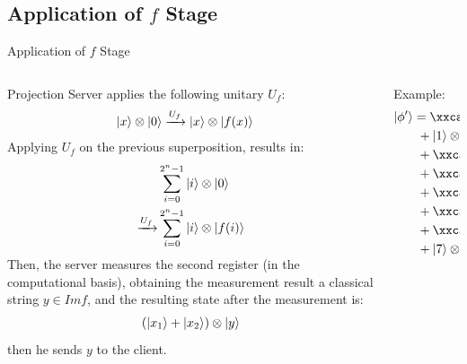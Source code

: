 \documentclass[]{beamer}
\begin{document}
\subsection{Application of $f$ Stage}
\begin{frame}[label=current]{Application of $f$ Stage}
  \begin{columns}
    \begin{column}{.4\textwidth}
      \begin{block}{Projection}
        Server applies the following unitary $U_f$:
        \begin{align*}
        & |x\rangle\otimes|0\rangle \xrightarrow{U_f} |x\rangle\otimes|f(x)\rangle
        \end{align*}
        Applying $U_f$ on the previous superposition, results in:
        \begin{align*}
          & \sum_{i=0}^{2^n-1} |i\rangle\otimes|0\rangle\\
          \xrightarrow{U_f} & \sum_{i=0}^{2^n-1} |i\rangle\otimes|f(i)\rangle
        \end{align*}
        Then, the server measures the second register (in the computational basis), obtaining the measurement result a classical string $y \in Imf$, and the resulting state after the measurement is: 
        \begin{align*}
          (|x_1\rangle + |x_2\rangle)\otimes|y\rangle
        \end{align*}
        then he sends $y$ to the client.
      \end{block}
    \end{column}
    \vrule{}
    \quad
   
    \begin{column}{.5\textwidth}
    
      Example:
      \begin{align*}
        \ket{\phi'}
        &= \xxcancel<2>{\ket{0}\otimes\textcolor{red}{\ket{4}}}\\
        &~+ \ket{1}\otimes\textcolor{blue}{\ket{2}}\\
        &~+ \xxcancel<2>{\ket{2}\otimes\textcolor{green}{\ket{6}}}\\
        &~+ \xxcancel<2>{\ket{3}\otimes\textcolor{red}{\ket{4}}}\\
        &~+ \xxcancel<2>{\ket{4}\otimes\textcolor{orange}{\ket{8}}}\\
        &~+ \xxcancel<2>{\ket{5}\otimes\textcolor{green}{\ket{6}}}\\
        &~+ \xxcancel<2>{\ket{6}\otimes\textcolor{orange}{\ket{8}}}\\
        &~+ \ket{7}\otimes\textcolor{blue}{\ket{2}}
      \end{align*}
    \end{column}
   
  \end{columns}
\end{frame}
\end{document}
